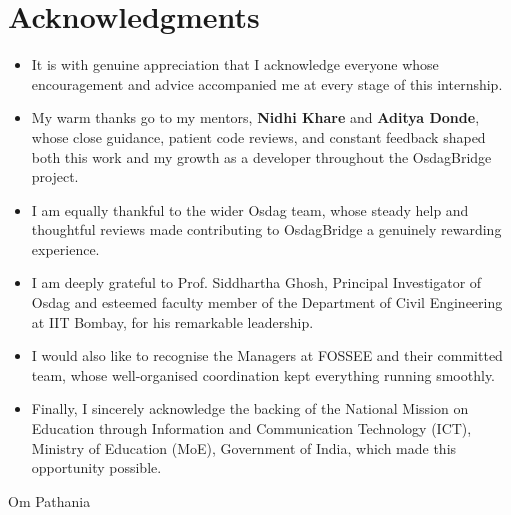 \chapter*{Acknowledgments}

\begingroup\Large
\begin{itemize}[leftmargin=1.4em]
  \item It is with genuine appreciation that I acknowledge everyone whose encouragement and
        advice accompanied me at every stage of this internship.
  \item My warm thanks go to my mentors, \textbf{Nidhi Khare} and \textbf{Aditya Donde}, whose
        close guidance, patient code reviews, and constant feedback shaped both this work and my
        growth as a developer throughout the OsdagBridge project.
  \item I am equally thankful to the wider Osdag team, whose steady help and thoughtful reviews
        made contributing to OsdagBridge a genuinely rewarding experience.
  \item I am deeply grateful to Prof. Siddhartha Ghosh, Principal Investigator of Osdag and esteemed
        faculty member of the Department of Civil Engineering at IIT Bombay, for his remarkable leadership.
  \item I would also like to recognise the Managers at FOSSEE and their committed team, whose
        well-organised coordination kept everything running smoothly.
  \item Finally, I sincerely acknowledge the backing of the National Mission on Education
        through Information and Communication Technology (ICT), Ministry of Education (MoE),
        Government of India, which made this opportunity possible.
\end{itemize}

\vspace{1cm}
\noindent\hfill Om Pathania
\endgroup
